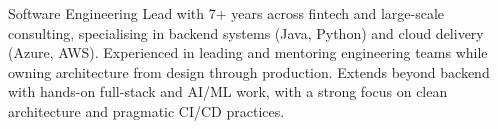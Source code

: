 

\begin{cvparagraph}

Software Engineering Lead with 7+ years across fintech and large-scale consulting, specialising in backend systems (Java, Python) and cloud delivery (Azure, AWS). Experienced in leading and mentoring engineering teams while owning architecture from design through production. Extends beyond backend with hands-on full-stack and AI/ML work, with a strong focus on clean architecture and pragmatic CI/CD practices.
\end{cvparagraph}
